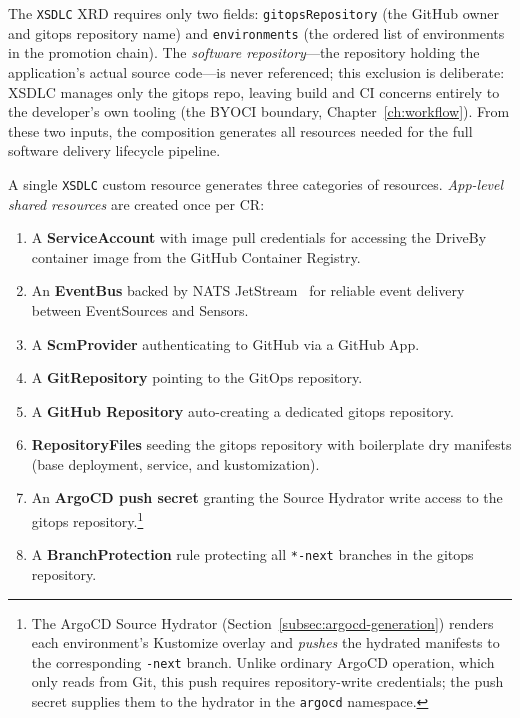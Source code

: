 The \texttt{XSDLC} XRD requires only two fields: \texttt{gitopsRepository} (the GitHub owner and gitops repository name) and \texttt{environments} (the ordered list of environments in the promotion chain). The \textit{software repository}---the repository holding the application's actual source code---is never referenced; this exclusion is deliberate: XSDLC manages only the gitops repo, leaving build and CI concerns entirely to the developer's own tooling (the BYOCI boundary, Chapter~\ref{ch:workflow}). From these two inputs, the composition generates all resources needed for the full software delivery lifecycle pipeline.

A single \texttt{XSDLC} custom resource generates three categories of resources. \textit{App-level shared resources} are created once per CR:

\begin{enumerate}
    \item A \textbf{ServiceAccount} with image pull credentials for accessing the DriveBy container image from the GitHub Container Registry.
    \item An \textbf{EventBus} backed by NATS JetStream~\cite{nats-jetstream} for reliable event delivery between EventSources and Sensors.
    \item A \textbf{ScmProvider} authenticating to GitHub via a GitHub App.
    \item A \textbf{GitRepository} pointing to the GitOps repository.
    \item A \textbf{GitHub Repository} auto-creating a dedicated gitops repository.
    \item \textbf{RepositoryFiles} seeding the gitops repository with boilerplate dry manifests (base deployment, service, and kustomization).
    \item An \textbf{ArgoCD push secret} granting the Source Hydrator write access to the gitops repository.\footnote{The ArgoCD Source Hydrator (Section~\ref{subsec:argocd-generation}) renders each environment's Kustomize overlay and \textit{pushes} the hydrated manifests to the corresponding \texttt{-next} branch. Unlike ordinary ArgoCD operation, which only reads from Git, this push requires repository-write credentials; the push secret supplies them to the hydrator in the \texttt{argocd} namespace.}
    \item A \textbf{BranchProtection} rule protecting all \texttt{*-next} branches in the gitops repository.
\end{enumerate}

